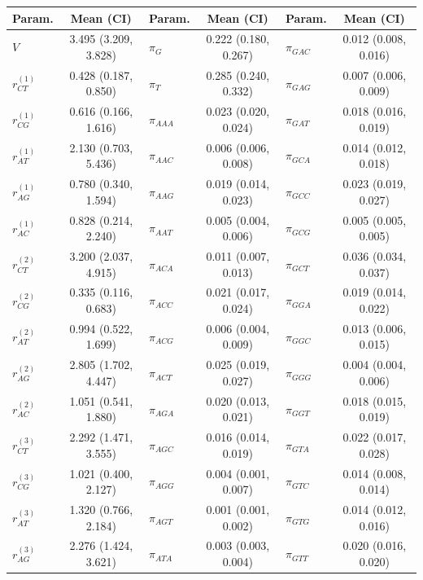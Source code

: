 \documentclass{svmult}
\begin{document}
\begin{center}
\begin{tabular}{lc lc lc}
Param. & Mean (CI) & Param. & Mean (CI) & Param. & Mean (CI) \\ \hline
$V$            & 3.495 (3.209, 3.828) & $\pi_{G}$      & 0.222 (0.180, 0.267) & $\pi_{GAC}$    & 0.012 (0.008, 0.016) \\
$r_{CT}^{(1)}$ & 0.428 (0.187, 0.850) & $\pi_{T}$      & 0.285 (0.240, 0.332) & $\pi_{GAG}$    & 0.007 (0.006, 0.009) \\
$r_{CG}^{(1)}$ & 0.616 (0.166, 1.616) & $\pi_{AAA}$    & 0.023 (0.020, 0.024) & $\pi_{GAT}$    & 0.018 (0.016, 0.019) \\
$r_{AT}^{(1)}$ & 2.130 (0.703, 5.436) & $\pi_{AAC}$    & 0.006 (0.006, 0.008) & $\pi_{GCA}$    & 0.014 (0.012, 0.018) \\
$r_{AG}^{(1)}$ & 0.780 (0.340, 1.594) & $\pi_{AAG}$    & 0.019 (0.014, 0.023) & $\pi_{GCC}$    & 0.023 (0.019, 0.027) \\
$r_{AC}^{(1)}$ & 0.828 (0.214, 2.240) & $\pi_{AAT}$    & 0.005 (0.004, 0.006) & $\pi_{GCG}$    & 0.005 (0.005, 0.005) \\
$r_{CT}^{(2)}$ & 3.200 (2.037, 4.915) & $\pi_{ACA}$    & 0.011 (0.007, 0.013) & $\pi_{GCT}$    & 0.036 (0.034, 0.037) \\
$r_{CG}^{(2)}$ & 0.335 (0.116, 0.683) & $\pi_{ACC}$    & 0.021 (0.017, 0.024) & $\pi_{GGA}$    & 0.019 (0.014, 0.022) \\
$r_{AT}^{(2)}$ & 0.994 (0.522, 1.699) & $\pi_{ACG}$    & 0.006 (0.004, 0.009) & $\pi_{GGC}$    & 0.013 (0.006, 0.015) \\
$r_{AG}^{(2)}$ & 2.805 (1.702, 4.447) & $\pi_{ACT}$    & 0.025 (0.019, 0.027) & $\pi_{GGG}$    & 0.004 (0.004, 0.006) \\
$r_{AC}^{(2)}$ & 1.051 (0.541, 1.880) & $\pi_{AGA}$    & 0.020 (0.013, 0.021) & $\pi_{GGT}$    & 0.018 (0.015, 0.019) \\
$r_{CT}^{(3)}$ & 2.292 (1.471, 3.555) & $\pi_{AGC}$    & 0.016 (0.014, 0.019) & $\pi_{GTA}$    & 0.022 (0.017, 0.028) \\
$r_{CG}^{(3)}$ & 1.021 (0.400, 2.127) & $\pi_{AGG}$    & 0.004 (0.001, 0.007) & $\pi_{GTC}$    & 0.014 (0.008, 0.014) \\
$r_{AT}^{(3)}$ & 1.320 (0.766, 2.184) & $\pi_{AGT}$    & 0.001 (0.001, 0.002) & $\pi_{GTG}$    & 0.014 (0.012, 0.016) \\
$r_{AG}^{(3)}$ & 2.276 (1.424, 3.621) & $\pi_{ATA}$    & 0.003 (0.003, 0.004) & $\pi_{GTT}$    & 0.020 (0.016, 0.020) \\

\end{tabular}
\end{center}
\end{document}

